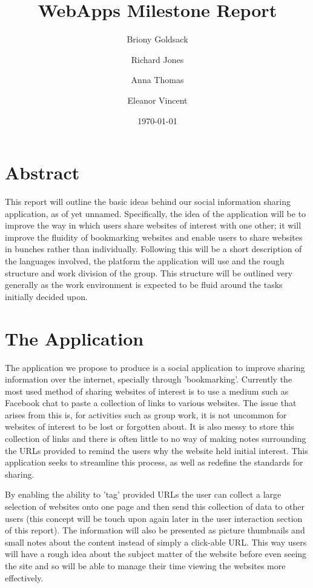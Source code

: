\documentclass[a4wide, 10pt]{article}
\begin{document}
\title{WebApps Milestone Report}
\author{Briony Goldsack \and Richard Jones \and Anna Thomas \and Eleanor Vincent}
\date{\today}         
\maketitle            

\section{Abstract}

This report will outline the basic ideas behind our social information sharing application, as of yet unnamed. Specifically, the idea of the application will be to improve the way in which users share websites of interest with one other; it will improve the fluidity of bookmarking websites and enable users to share websites in bunches rather than individually. Following this will be a short description of the languages involved, the platform the application will use and the rough structure and work division of the group. This structure will be outlined very generally as the work environment is expected to be fluid around the tasks initially decided upon.

\section{The Application}

The application we propose to produce is a social application to improve sharing information over the internet, specially through 'bookmarking'. Currently the most used method of sharing websites of interest is to use a medium such as Facebook chat to paste a collection of links to various websites. The issue that arises from this is, for activities such as group work, it is not uncommon for websites of interest to be lost or forgotten about. It is also messy to store this collection of links and there is often little to no way of making notes surrounding the URLs provided to remind the users why the website held initial interest. This application seeks to streamline this process, as well as redefine the standards for sharing. 

By enabling the ability to 'tag' provided URLs the user can collect a large selection of websites onto one page and then send this collection of data to other users (this concept will be touch upon again later in the user interaction section of this report). The information will also be presented as picture thumbnails and small notes about the content instead of simply a click-able URL. This way users will have a rough idea about the subject matter of the website before even seeing the site and so will be able to manage their time viewing the websites more effectively. 
\end{document}
